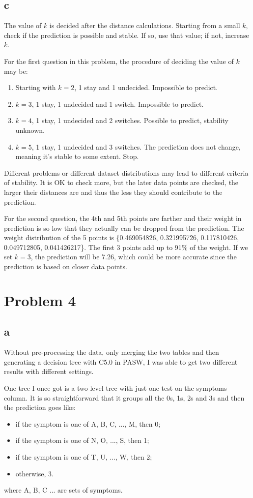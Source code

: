 \documentclass[12pt]{article}
\begin{document}
\subsection{c}
The value of $k$ is decided after the distance calculations. Starting from a small $k$, check if the prediction is possible and stable. If so, use that value; if not, increase $k$.

For the first question in this problem, the procedure of deciding the value of $k$ may be:
\begin{enumerate}
\item Starting with $k=2$, 1 stay and 1 undecided. Impossible to predict.
\item $k=3$, 1 stay, 1 undecided and 1 switch. Impossible to predict.
\item $k=4$, 1 stay, 1 undecided and 2 switches. Possible to predict, stability unknown.
\item $k=5$, 1 stay, 1 undecided and 3 switches. The prediction does not change, meaning it's stable to some extent. Stop.
\end{enumerate}

Different problems or different dataset distributions may lead to different criteria of stability. It is OK to check more, but the later data points are checked, the larger their distances are and thus the less they should contribute to the prediction.

For the second question, the 4th and 5th points are farther and their weight in prediction is so low that they actually can be dropped from the prediction. The weight distribution of the 5 points is \{0.469054826, 0.321995726, 0.117810426, 0.049712805, 0.041426217\}. The first 3 points add up to 91\% of the weight. If we set $k=3$, the prediction will be 7.26, which could be more accurate since the prediction is based on closer data points.

\section{Problem 4}
\subsection{a} %
\label{sub:4a}
Without pre-processing the data, only merging the two tables and then generating a decision tree with C5.0 in PASW, I was able to get two different results with different settings.

One tree I once got is a two-level tree with just one test on the symptoms column. It is so straightforward that it groups all the 0s, 1s, 2s and 3s and then the prediction goes like:
\begin{itemize}
	\item if the symptom is one of A, B, C, ..., M, then 0;
	\item if the symptom is one of N, O, ..., S, then 1;
	\item if the symptom is one of T, U, ..., W, then 2;
	\item otherwise, 3.
\end{itemize}
where A, B, C ... are sets of symptoms.
\end{document}
